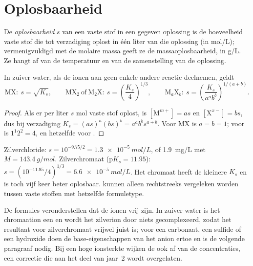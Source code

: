 \section{Oplosbaarheid}

\begin{definition}[Oplosbaarheid]\label{def:b1:precipitation:solubility}
De \emph{oplosbaarheid} $s$ van een vaste stof in
een gegeven oplossing is de hoeveelheid vaste stof die tot verzadiging
oplost in één liter van die oplossing (in \unit{mol/L}); vermenigvuldigd
met de molaire massa geeft ze de massaoplosbaarheid, in \unit{g/L}. Ze
hangt af van de temperatuur en van de samenstelling van de oplossing.
\end{definition}

\begin{proposition}\label{prop:b1:precipitation:s-of-ks}
In zuiver water, als de ionen aan geen enkele andere reactie deelnemen,
geldt
\[
  \mathrm{MX}:\ s = \sqrt{K_s}, \qquad
  \mathrm{MX_2}\ \text{of}\ \mathrm{M_2X}:\ s = \left(\frac{K_s}{4}\right)^{1/3},
  \qquad
  \mathrm{M}_a\mathrm{X}_b:\ s = \left(\frac{K_s}{a^a b^b}\right)^{1/(a+b)} .
\]
\end{proposition}

\begin{proof}
Als er per liter $s$ mol vaste stof oplost, is $[\mathrm{M}^{m+}] = as$ en
$[\mathrm{X}^{x-}] = bs$, dus bij verzadiging $K_s = (as)^a(bs)^b =
a^a b^b s^{a+b}$. Voor MX is $a = b = 1$; voor  is $1^1 2^2 = 4$,
en hetzelfde voor .
\end{proof}

\begin{example}\label{ex:b1:precipitation:agcl-ag2cro4}
Zilverchloride: $s = 10^{-9.75/2} = \qty{1.3e-5}{mol/L}$, of
\qty{1.9}{mg/L} met $M = \qty{143.4}{g/mol}$. Zilverchromaat 
($\mathrm{p}K_s = 11.95$): $s = (10^{-11.95}/4)^{1/3} =
\qty{6.6e-5}{mol/L}$. Het chromaat heeft de kleinere $K_s$ en is toch
vijf keer beter oplosbaar.  kunnen alleen
rechtstreeks vergeleken worden tussen vaste stoffen met hetzelfde
formuletype.
\end{example}

\begin{remark}
De formules veronderstellen dat de ionen vrij zijn. In zuiver water is
het chromaation een  en wordt het zilverion door niets
gecomplexeerd, zodat het resultaat voor zilverchromaat vrijwel juist is;
voor een carbonaat, een sulfide of een hydroxide doen de base-eigenschappen
van het anion ertoe en is de volgende paragraaf nodig. Bij een hoge
ionsterkte wijken de  ook af van de concentraties, een
correctie die aan het deel van jaar~2 wordt overgelaten.
\end{remark}

